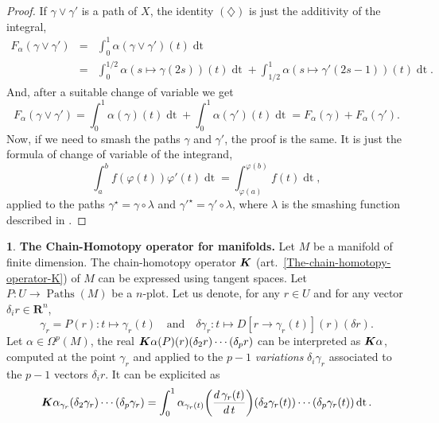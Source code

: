 \documentclass[11pt,reqno]{amsart}
\theoremstyle{definition}
\newtheorem{article}{}
\newcommand{\artlabel}[1]{{\bf #1.}}
\renewcommand{\over}{\above .2pt}
\newcommand{\RR}{{\mathbf R}}
\def \D{{D}}
\def \F{{F}}
\def \M{{M}}
\def \P{{P}}
\def \U{{U}}
\def \X{{X}}
\newcommand{\eK}{\mbox{\boldmath $K$}}
\newcommand{\art}[1]{{(art.~\ref{#1})}}
\newcommand{\Paths}{\operatorname{Paths}}
\newcommand{\dt}{\operatorname{dt}}
\begin{document}
  \begin{proof}
    If $\gamma\vee\gamma'$ is a path of $\X$, the identity
    $(\diamondsuit)$ is just the additivity of the integral,
    \begin{eqnarray*} 
      \F_\alpha(\gamma\vee\gamma') & = &
      \int_0^1\alpha(\gamma\vee\gamma')(t) \dt \\ 
      & = & \int_0^{1/2}\alpha(s \mapsto \gamma(2s))(t) \dt
      +\int_{1/2}^1\alpha(s \mapsto \gamma'(2s-1))(t) \dt. 
    \end{eqnarray*}
    And, after a suitable change of variable we get
    $$
      \F_\alpha(\gamma\vee\gamma') =
      \int_0^{1}\alpha(\gamma)(t) \dt
      +\int_{0}^1\alpha(\gamma')(t) \dt = \F_\alpha(\gamma) +
      \F_\alpha(\gamma').
      $$
    Now, if we need to smash the paths $\gamma$ and
    $\gamma'$, the proof is the same. It is just the formula
    of change of variable of the integrand,
    $$
      \int_a^b f(\varphi(t)) \varphi'(t) \dt = 
      \int_{\varphi(a)}^{\varphi(b)} f(t) \dt,
      $$ 
    applied to the paths $\gamma^\star = \gamma \circ
      \lambda$ and  $\gamma'^\star = \gamma' \circ \lambda$,
    where $\lambda$ is the smashing
    function described in \cite{Piz05}.
  \end{proof}
  
  \begin{article}\artlabel{The Chain-Homotopy operator for manifolds} 
    \label{The-Chain-Homotopy-operator-for-manifolds}
    Let $\M$ be a manifold of finite dimension. The
    chain-homotopy operator $\eK$
    \art{The-chain-homotopy-operator-K} of $\M$ can be
    expressed using tangent spaces. Let $\P : \U \to
      \Paths(\M)$ be a $n$-plot. Let us denote, for any $r \in
        \U$ and for any vector $\delta_i r \in \RR^n$,
    $$
      \gamma_r
      = \P(r): t \mapsto \gamma_r(t) \quad \mbox{and} \quad \delta
      \gamma_r: t \mapsto \D[r \to \gamma_r(t)](r)(\delta r).
      $$
    Let $\alpha \in
      \Omega^p(\M)$, the real $\eK\alpha(\P)(r)(\delta_2
        r)\cdots(\delta_{p}r)$ can be interpreted as
    $\eK\alpha$, computed at the point $\gamma_r$ and applied
    to the $p-1$ {\em variations} $\delta_i\gamma_r$
    associated to the $p-1$ vectors $\delta_i r$. It can be
    explicited as
    $$ 
      \eK\alpha_{\gamma_r}(\delta_2\gamma_r)\cdots (\delta_{p}
      \gamma_r)
      = \int_0^1\alpha_{\gamma_r(t)}\bigg({d\,\gamma_r(t) \over
      d\,t}\bigg) (\delta_2
      \gamma_r(t))\cdots(\delta_{p}\gamma_r(t))\dt.
      $$ 
  \end{article} %
  
\end{document}
